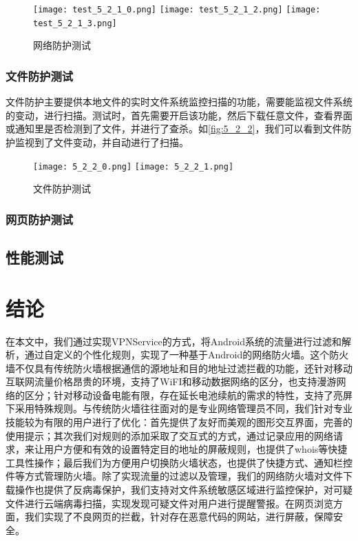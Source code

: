 \documentclass[format=final, language=chinese, degree=fyp]{hustthesis}
\begin{document}
\FloatBarrier
	\begin{figure}
		\texttt{[image: test\_5\_2\_1\_0.png]}
	\hspace{0.3cm}
		\texttt{[image: test\_5\_2\_1\_2.png]}
	\hspace{0.3cm}
		\texttt{[image: test\_5\_2\_1\_3.png]}	
	\caption{网络防护测试}\label{fig:5_2_1}
\end{figure}
\FloatBarrier
	
\subsection{文件防护测试}

文件防护主要提供本地文件的实时文件系统监控扫描的功能，需要能监视文件系统的变动，进行扫描。测试时，首先需要开启该功能，然后下载任意文件，查看界面或通知里是否检测到了文件，并进行了查杀。如\autoref{fig:5_2_2}，我们可以看到文件防护监视到了文件变动，并自动进行了扫描。

\FloatBarrier
	\begin{figure}[!h]
		\centering
		\texttt{[image: 5\_2\_2\_0.png]}
	\hspace{0.3cm}
		\texttt{[image: 5\_2\_2\_1.png]}
		\caption{文件防护测试}\label{fig:5_2_2}
	\end{figure}
\FloatBarrier

\subsection{网页防护测试}



\section{性能测试}


\chapter{结论}

在本文中，我们通过实现VPNService的方式，将Android系统的流量进行过滤和解析，通过自定义的个性化规则，实现了一种基于Android的网络防火墙。这个防火墙不仅具有传统防火墙根据通信的源地址和目的地址过滤拦截的功能，还针对移动互联网流量价格昂贵的环境，支持了WiFI和移动数据网络的区分，也支持漫游网络的区分；针对移动设备电能有限，存在延长电池续航的需求的特性，支持了亮屏下采用特殊规则。与传统防火墙往往面对的是专业网络管理员不同，我们针对专业技能较为有限的用户进行了优化：首先提供了友好而美观的图形交互界面，完善的使用提示；其次我们对规则的添加采取了交互式的方式，通过记录应用的网络请求，来让用户方便和有效的设置特定目的地址的屏蔽规则，也提供了whois等快捷工具性操作；最后我们为方便用户切换防火墙状态，也提供了快捷方式、通知栏控件等方式管理防火墙。除了实现流量的过滤以及管理，我们的网络防火墙对文件下载操作也提供了反病毒保护，我们支持对文件系统敏感区域进行监控保护，对可疑文件进行云端病毒扫描，实现发现可疑文件对用户进行提醒警报。在网页浏览方面，我们实现了不良网页的拦截，针对存在恶意代码的网站，进行屏蔽，保障安全。
\end{document}
